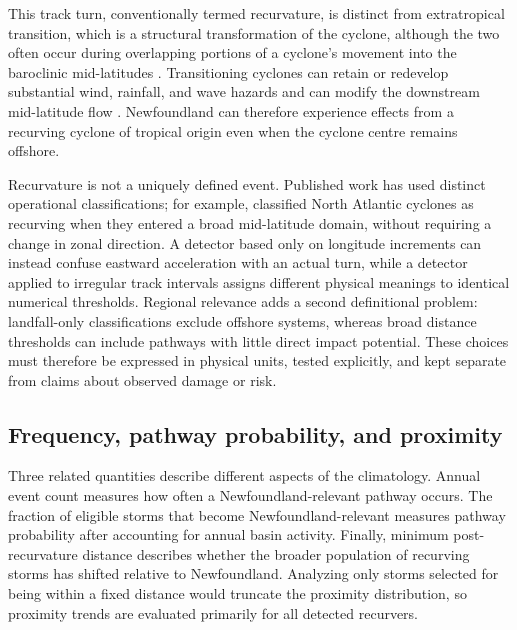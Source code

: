 \documentclass[11pt]{article}
\begin{document}
This track turn, conventionally termed recurvature, is distinct from extratropical transition, which is a structural transformation of the cyclone, although the two often occur during overlapping portions of a cyclone's movement into the baroclinic mid-latitudes \citep{HartEvans2001,EvansHart2003,Jones2003}. Transitioning cyclones can retain or redevelop substantial wind, rainfall, and wave hazards and can modify the downstream mid-latitude flow \citep{Evans2017,Keller2019}. Newfoundland can therefore experience effects from a recurving cyclone of tropical origin even when the cyclone centre remains offshore.

Recurvature is not a uniquely defined event. Published work has used distinct operational classifications; for example, \citet{Sainsbury2022} classified North Atlantic cyclones as recurving when they entered a broad mid-latitude domain, without requiring a change in zonal direction. A detector based only on longitude increments can instead confuse eastward acceleration with an actual turn, while a detector applied to irregular track intervals assigns different physical meanings to identical numerical thresholds. Regional relevance adds a second definitional problem: landfall-only classifications exclude offshore systems, whereas broad distance thresholds can include pathways with little direct impact potential. These choices must therefore be expressed in physical units, tested explicitly, and kept separate from claims about observed damage or risk.

\subsection{Frequency, pathway probability, and proximity}
Three related quantities describe different aspects of the climatology. Annual event count measures how often a Newfoundland-relevant pathway occurs. The fraction of eligible storms that become Newfoundland-relevant measures pathway probability after accounting for annual basin activity. Finally, minimum post-recurvature distance describes whether the broader population of recurving storms has shifted relative to Newfoundland. Analyzing only storms selected for being within a fixed distance would truncate the proximity distribution, so proximity trends are evaluated primarily for all detected recurvers.
\end{document}
